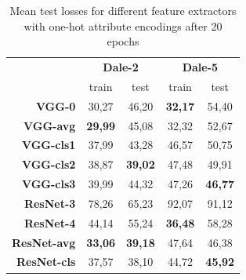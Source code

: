 \begin{table}[ht]
    \centering
    \begin{tabular}{rcccc}
        \toprule
                            & \multicolumn{2}{c}{\textbf{Dale-2}} & \multicolumn{2}{c}{\textbf{Dale-5}}                                   \\\cmidrule(lr){2-3}\cmidrule(lr){4-5}
                            & train                               & test                                & train          & test           \\\midrule
        \textbf{VGG-0}      & 30,27                               & 46,20                               & \textbf{32,17} & 54,40          \\
        \textbf{VGG-avg}    & \textbf{29,99}                      & 45,08                               & 32,32          & 52,67          \\
        \textbf{VGG-cls1}   & 37,99                               & 43,28                               & 46,57          & 50,75          \\
        \textbf{VGG-cls2}   & 38,87                               & \textbf{39,02}                      & 47,48          & 49,91          \\
        \textbf{VGG-cls3}   & 39,99                               & 44,32                               & 47,26          & \textbf{46,77} \\\midrule
        \textbf{ResNet-3}   & 78,26                               & 65,23                               & 92,07          & 91,12          \\
        \textbf{ResNet-4}   & 44,14                               & 55,24                               & \textbf{36,48} & 58,28          \\
        \textbf{ResNet-avg} & \textbf{33,06}                      & \textbf{39,18}                      & 47,64          & 46,38          \\
        \textbf{ResNet-cls} & 37,57                               & 38,10                               & 44,72          & \textbf{45,92} \\
        \bottomrule
    \end{tabular}
    \caption{Mean test losses for different feature extractors with one-hot attribute encodings after 20 epochs}
    \label{tab:feature-extractor-mean-distances}
\end{table}

